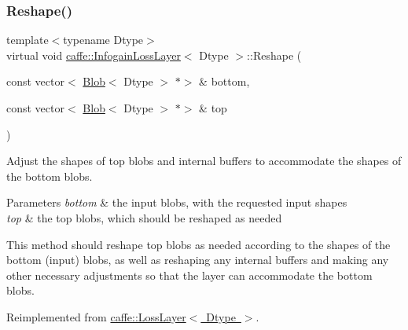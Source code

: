 \subsubsection{\texorpdfstring{Reshape()}{Reshape()}\hspace{0.1cm}{\footnotesize\ttfamily [1/2]}}
{\footnotesize\ttfamily template$<$typename Dtype$>$ \\
virtual void \mbox{\hyperlink{classcaffe_1_1_infogain_loss_layer}{caffe\+::\+Infogain\+Loss\+Layer}}$<$ Dtype $>$\+::Reshape (\begin{DoxyParamCaption}\item[{const vector$<$ \mbox{\hyperlink{classcaffe_1_1_blob}{Blob}}$<$ Dtype $>$ $\ast$$>$ \&}]{bottom,  }\item[{const vector$<$ \mbox{\hyperlink{classcaffe_1_1_blob}{Blob}}$<$ Dtype $>$ $\ast$$>$ \&}]{top }\end{DoxyParamCaption})\hspace{0.3cm}{\ttfamily [virtual]}}



Adjust the shapes of top blobs and internal buffers to accommodate the shapes of the bottom blobs. 


\begin{DoxyParams}{Parameters}
{\em bottom} & the input blobs, with the requested input shapes \\
\hline
{\em top} & the top blobs, which should be reshaped as needed\\
\hline
\end{DoxyParams}
This method should reshape top blobs as needed according to the shapes of the bottom (input) blobs, as well as reshaping any internal buffers and making any other necessary adjustments so that the layer can accommodate the bottom blobs. 

Reimplemented from \mbox{\hyperlink{classcaffe_1_1_loss_layer_abf00412194f5413ea9468ee44b0d986f}{caffe\+::\+Loss\+Layer$<$ Dtype $>$}}.

\mbox{\label{classcaffe_1_1_infogain_loss_layer_a83ed478450bc7f629499fed37f654c5c}} 
